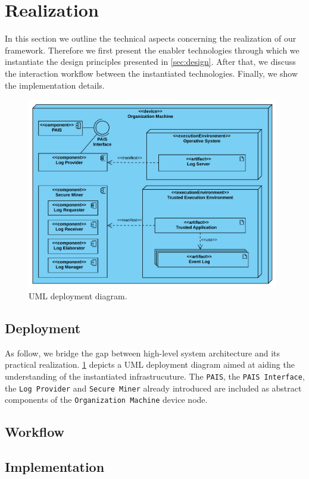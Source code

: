 \section{Realization}
In this section we outline the technical aspects concerning the realization of our framework. Therefore we first present the enabler technologies through which we instantiate the design principles presented in \cref{sec:design}. After that, we discuss the interaction workflow between the instantiated technologies. Finally, we show the implementation details.
\begin{figure}[t]
\centering
\includegraphics[width=11cm]{content/figures/deployment_diagram.pdf}
\caption{UML deployment diagram.}
\label{fig:deployment_diagram}
\end{figure}
\subsection{Deployment}
As follow, we bridge the gap between high-level system architecture and its practical realization. \cref{fig:deployment_diagram} depicts a UML deployment diagram \cite{koch2002expressive} aimed at aiding the understanding of the instantiated infrastrucuture. The \texttt{PAIS}, the \texttt{PAIS Interface}, the \texttt{Log Provider} and \texttt{Secure Miner} already introduced are included as abstract components of the \texttt{Organization Machine} device node.

\subsection{Workflow}
\subsection{Implementation}
